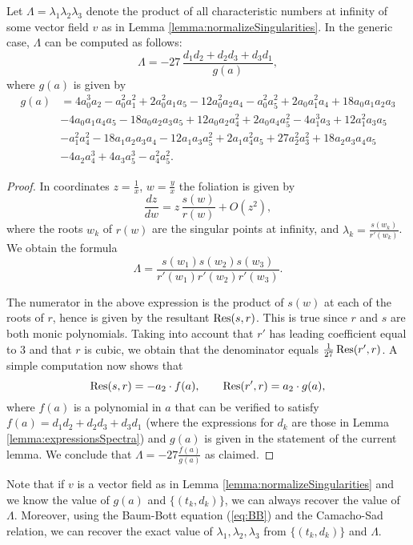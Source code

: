 \documentclass[phd,tocprelim]{cornell}
\begin{document}
\begin{lemma}\label{lemma:expressionLambda}
 Let $\Lambda=\lambda_1\lambda_2\lambda_3$ denote the product of all characteristic numbers at infinity of some vector field $v$ as in Lemma \ref{lemma:normalizeSingularities}. In the generic case, $\Lambda$ can be computed as follows:
 \begin{equation}\label{eq:expressionLambda}
  \Lambda = -27\,\frac{d_1d_2+d_2d_3+d_3d_1}{g(a)},
 \end{equation}
 where $g(a)$ is given by
 \begin{align*}
  g(a) &= 4a_0^3a_2-a_0^2a_1^2+2a_0^2a_1a_5-12a_0^2a_2a_4-a_0^2a_5^2+2a_0a_1^2a_4+18a_0a_1a_2a_3 \\
  & -4a_0a_1a_4a_5-18a_0a_2a_3a_5+12a_0a_2a_4^2+2a_0a_4a_5^2-4a_1^3a_3+12a_1^2a_3a_5 \\
  & -a_1^2a_4^2-18a_1a_2a_3a_4-12a_1a_3a_5^2+2a_1a_4^2a_5+27a_2^2a_3^2+18a_2a_3a_4a_5 \\
  & -4a_2a_4^3+4a_3a_5^3-a_4^2a_5^2.
 \end{align*}
\end{lemma}

\begin{proof}
 In coordinates $z=\displaystyle\frac{1}{x}$, $w=\displaystyle\frac{y}{x}$ the foliation is given by 
  \[ \frac{dz}{dw} = z\,\frac{s(w)}{r(w)} + O(z^2), \]
 where the roots $w_k$ of $r(w)$ are the singular points at infinity, and  $\lambda_k=\displaystyle\frac{s(w_k)}{r'(w_k)}$. We obtain the formula
  \[ \Lambda = \frac{s(w_1)s(w_2)s(w_3)}{r'(w_1)r'(w_2)r'(w_3)}. \]
  
 The numerator in the above expression is the product of $s(w)$ at each of the roots of $r$, hence is given by the resultant $\operatorname{Res}(s,r)$.  This is true since $r$ and $s$ are both monic polynomials. Taking into account that $r'$ has leading coefficient equal to $3$ and that $r$ is cubic, we obtain that the denominator equals $\frac{1}{27}\operatorname{Res}(r',r)$. A simple computation now shows that 
  \[ \operatorname{Res}(s,r)=-a_2\cdot f(a), \qquad \operatorname{Res}(r',r)=a_2\cdot g(a), \]
 where $f(a)$ is a polynomial in $a$ that can be verified to satisfy $f(a)=d_1d_2+d_2d_3+d_3d_1$ (where the expressions for $d_k$ are those in Lemma \ref{lemma:expressionsSpectra}) and $g(a)$ is given in the statement of the current lemma. We conclude that $\Lambda=-27\frac{f(a)}{g(a)}$ as claimed.
\end{proof}

\begin{remark}\label{rmk:determineLambdas}
 Note that if $v$ is a vector field as in Lemma \ref{lemma:normalizeSingularities} and we know the value of $g(a)$ and $\{(t_k,d_k)\}$, we can always recover the value of $\Lambda$. Moreover, using the Baum-Bott equation (\ref{eq:BB}) and the Camacho-Sad relation, we can recover the exact value of $\lambda_1,\lambda_2,\lambda_3$ from $\{(t_k,d_k)\}$ and $\Lambda$.
\end{remark}
\end{document}
